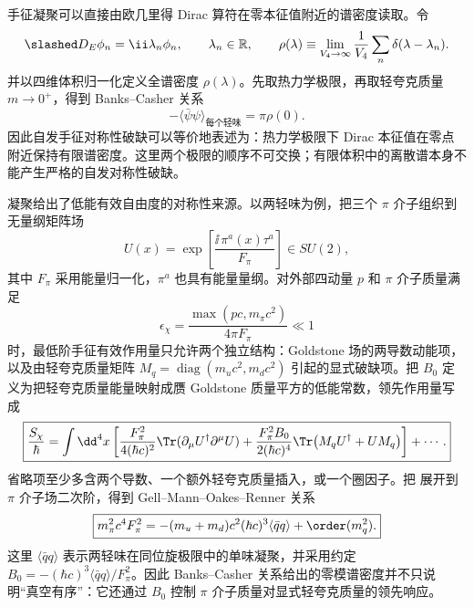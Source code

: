 手征凝聚可以直接由欧几里得 Dirac 算符在零本征值附近的谱密度读取。令
\begin{equation}
 \slashed D_E\phi_n=\ii\lambda_n\phi_n,
 \qquad \lambda_n\in\mathbb R,
 \qquad
 \rho(\lambda)\equiv\lim_{V_4\to\infty}\frac1{V_4}\sum_n\delta(\lambda-\lambda_n).
 \label{eq:qcd-dirac-spectral-density-dp68}
\end{equation}
并以四维体积归一化定义全谱密度 $\rho(\lambda)$。先取热力学极限，再取轻夸克质量 $m\to0^+$，得到 Banks--Casher 关系
\begin{equation}
 \boxed{
 -\langle\bar\psi\psi\rangle_{\text{每个轻味}}
 =\pi\rho(0).}
 \label{eq:banks-casher-dp11}
\end{equation}
因此自发手征对称性破缺可以等价地表述为：热力学极限下 Dirac 本征值在零点附近保持有限谱密度。这里两个极限的顺序不可交换；有限体积中的离散谱本身不能产生严格的自发对称性破缺。

凝聚给出了低能有效自由度的对称性来源。以两轻味为例，把三个 \(\pi\) 介子组织到无量纲矩阵场
\begin{equation*}
 U(x)=\exp\!\left[\frac{\ii\,\pi^a(x)\tau^a}{F_\pi}\right]\in SU(2),
\end{equation*}
其中 $F_\pi$ 采用能量归一化，$\pi^a$ 也具有能量量纲。对外部四动量 $p$ 和 \(\pi\) 介子质量满足
\begin{equation}
 \boxed{
 \epsilon_\chi
 =\frac{\max(pc,m_\pi c^2)}{4\pi F_\pi}\ll1}
 \label{eq:qcd-chiral-control-dp33}
\end{equation}
时，最低阶手征有效作用量只允许两个独立结构：Goldstone 场的两导数动能项，以及由轻夸克质量矩阵 $M_q=\operatorname{diag}(m_uc^2,m_dc^2)$ 引起的显式破缺项。把 $B_0$ 定义为把轻夸克质量能量映射成赝 Goldstone 质量平方的低能常数，领先作用量写成
\begin{equation}
 \boxed{
 \frac{S_\chi}{\hbar}
 =\int\dd^4 x\left[
 \frac{F_\pi^2}{4(\hbar c)^2}
 \Tr(\partial_\mu U^\dagger\partial^\mu U)
 +\frac{F_\pi^2B_0}{2(\hbar c)^4}
 \Tr\!\left(M_qU^\dagger+UM_q\right)
 \right]+\cdots .}
 \label{eq:qcd-chiral-lo-action-dp33}
\end{equation}
省略项至少多含两个导数、一个额外轻夸克质量插入，或一个圈因子。把 展开到 \(\pi\) 介子场二次阶，得到 Gell--Mann--Oakes--Renner 关系
\begin{equation}
 \boxed{
 m_\pi^2c^4F_\pi^2
 =-(m_u+m_d)c^2(\hbar c)^3
 \langle\bar q q\rangle
 +\order(m_q^2).}
 \label{eq:qcd-gmor-dp33}
\end{equation}
这里 $\langle\bar q q\rangle$ 表示两轻味在同位旋极限中的单味凝聚，并采用约定 $B_0=-(\hbar c)^3\langle\bar q q\rangle/F_\pi^2$。因此 Banks--Casher 关系给出的零模谱密度并不只说明“真空有序”：它还通过 $B_0$ 控制 \(\pi\) 介子质量对显式轻夸克质量的领先响应。

